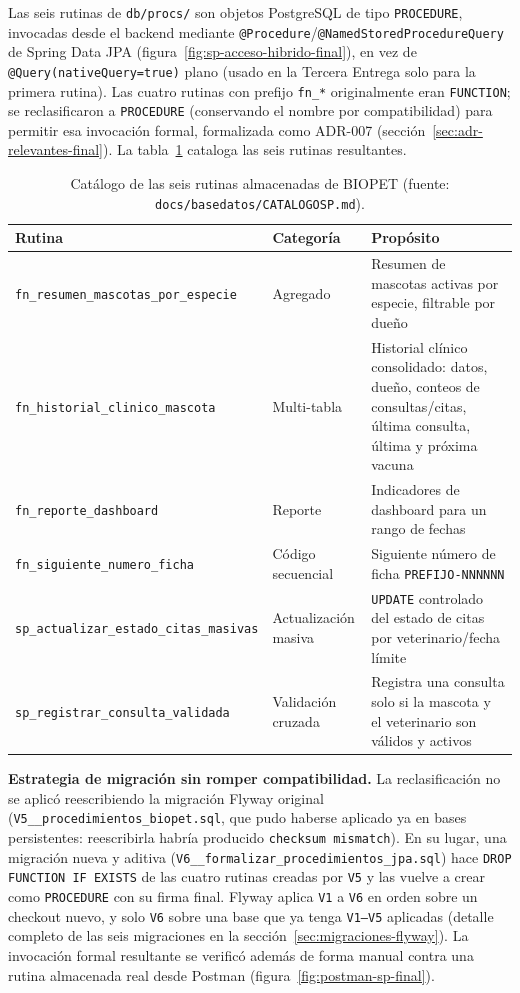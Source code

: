 Las seis rutinas de \texttt{db/procs/} son objetos PostgreSQL de tipo
\texttt{PROCEDURE}, invocadas desde el backend mediante
\texttt{@Procedure}/\texttt{@NamedStoredProcedureQuery} de Spring Data JPA
(figura~\ref{fig:sp-acceso-hibrido-final}), en vez de
\texttt{@Query(nativeQuery=true)} plano (usado en la Tercera Entrega solo
para la primera rutina). Las cuatro rutinas con prefijo \texttt{fn\_*}
originalmente eran \texttt{FUNCTION}; se reclasificaron a
\texttt{PROCEDURE} (conservando el nombre por compatibilidad) para permitir
esa invocaci\'on formal, formalizada como ADR-007 (secci\'on~\ref{sec:adr-relevantes-final}).
La tabla~\ref{tab:catalogo-sp} cataloga las seis rutinas resultantes.

\begin{table}[H]
  \centering
  \small
  \caption{Cat\'alogo de las seis rutinas almacenadas de BIOPET (fuente: \texttt{docs/basedatos/CATALOGOSP.md}).}
  \label{tab:catalogo-sp}
  \begin{tabular}{@{}p{4.0cm}p{2.35cm}p{6.45cm}@{}}
    \toprule
    Rutina & Categor\'ia & Prop\'osito \\
    \midrule
    \texttt{fn\_resumen\_mascotas\_por\_especie} & Agregado & Resumen de mascotas activas por especie, filtrable por due\~no \\
    \texttt{fn\_historial\_clinico\_mascota} & Multi-tabla & Historial cl\'inico consolidado: datos, due\~no, conteos de consultas/citas, \'ultima consulta, \'ultima y pr\'oxima vacuna \\
    \texttt{fn\_reporte\_dashboard} & Reporte & Indicadores de dashboard para un rango de fechas \\
    \texttt{fn\_siguiente\_numero\_ficha} & C\'odigo secuencial & Siguiente n\'umero de ficha \texttt{PREFIJO-NNNNNN} \\
    \texttt{sp\_actualizar\_estado\_citas\_masivas} & Actualizaci\'on masiva & \texttt{UPDATE} controlado del estado de citas por veterinario/fecha l\'imite \\
    \texttt{sp\_registrar\_consulta\_validada} & Validaci\'on cruzada & Registra una consulta solo si la mascota y el veterinario son v\'alidos y activos \\
    \bottomrule
  \end{tabular}
\end{table}

\textbf{Estrategia de migraci\'on sin romper compatibilidad.} La
reclasificaci\'on no se aplic\'o reescribiendo la migraci\'on Flyway
original (\texttt{V5\_\_procedimientos\_biopet.sql}, que pudo haberse
aplicado ya en bases persistentes: reescribirla habr\'ia producido
\texttt{checksum mismatch}). En su lugar, una migraci\'on nueva y aditiva
(\texttt{V6\_\_formalizar\_procedimientos\_jpa.sql}) hace \texttt{DROP
FUNCTION IF EXISTS} de las cuatro rutinas creadas por \texttt{V5} y las
vuelve a crear como \texttt{PROCEDURE} con su firma final. Flyway aplica
\texttt{V1} a \texttt{V6} en orden sobre un checkout nuevo, y solo
\texttt{V6} sobre una base que ya tenga \texttt{V1--V5} aplicadas (detalle
completo de las seis migraciones en la
secci\'on~\ref{sec:migraciones-flyway}). La invocaci\'on formal resultante
se verific\'o adem\'as de forma manual
contra una rutina almacenada real desde Postman
(figura~\ref{fig:postman-sp-final}).

